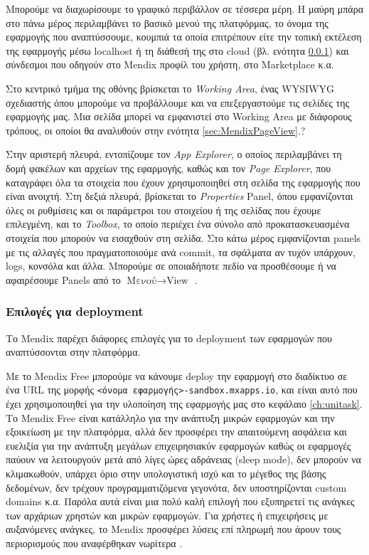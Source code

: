         Μπορούμε να διαχωρίσουμε το γραφικό περιβάλλον σε τέσσερα μέρη. Η μαύρη μπάρα στο πάνω μέρος περιλαμβάνει το βασικό μενού της πλατφόρμας, το όνομα της εφαρμογής που αναπτύσσουμε, κουμπιά τα οποία επιτρέπουν είτε την τοπική εκτέλεση της εφαρμογής μέσω localhost ή τη διάθεσή της στο cloud (βλ. ενότητα \ref{sec:MendixDeployment}) και σύνδεσμοι που οδηγούν στο Mendix προφίλ του χρήστη, στο Marketplace κ.α.

        Στο κεντρικό τμήμα της οθόνης βρίσκεται το \textit{Working Area}, ένας WYSIWYG σχεδιαστής όπου μπορούμε να προβάλλουμε και να επεξεργαστούμε τις σελίδες της εφαρμογής μας. Μια σελίδα μπορεί να εμφανιστεί στο Working Area με διάφορους τρόπους, οι οποίοι θα αναλυθούν στην ενότητα \ref{sec:MendixPageView}.?

        Στην αριστερή πλευρά, εντοπίζουμε τον \textit{App Explorer}, ο οποίος περιλαμβάνει τη δομή φακέλων και αρχείων της εφαρμογής, καθώς και τον \textit{Page Explorer}, που καταγράφει όλα τα στοιχεία που έχουν χρησιμοποιηθεί στη σελίδα της εφαρμογής που είναι ανοιχτή. Στη δεξιά πλευρά, βρίσκεται το \textit{Properties} Panel, όπου εμφανίζονται όλες οι ρυθμίσεις και οι παράμετροι του στοιχείου ή της σελίδας που έχουμε επιλεγμένη, και το \textit{Toolbox}, το οποίο περιέχει ένα σύνολο από προκατασκευασμένα στοιχεία που μπορούν να εισαχθούν στη σελίδα. Στο κάτω μέρος εμφανίζονται panels με τις αλλαγές που πραγματοποιούμε ανά commit, τα σφάλματα αν τυχόν υπάρχουν, logs, κονσόλα και άλλα. Μπορούμε σε οποιαδήποτε πεδίο να προσθέσουμε ή να αφαιρέσουμε Panels από το $ \text{Μενού} \rightarrow \text{View} $ \cite{mendixDoc}.

        \subsubsection{Επιλογές για deployment} \label{sec:MendixDeployment}
            Το Mendix παρέχει διάφορες επιλογές για το deployment των εφαρμογών που αναπτύσσονται στην πλατφόρμα.

            Με το Mendix Free μπορούμε να κάνουμε deploy την εφαρμογή στο διαδίκτυο σε ένα URL της μορφής \texttt{<όνομα εφαρμογής>-sandbox.mxapps.io}, και είναι αυτό που έχει χρησιμοποιηθεί για την υλοποίηση της εφαρμογής μας στο κεφάλαιο \ref{ch:unitask}. Το Mendix Free είναι κατάλληλο για την ανάπτυξη μικρών εφαρμογών και την εξοικείωση με την πλατφόρμα, αλλά δεν προσφέρει την απαιτούμενη ασφάλεια και ευελιξία για την ανάπτυξη μεγάλων επιχειρησιακύν εφαρμογών καθώς οι εφαρμογές παύουν να λειτουργούν μετά από λίγες ώρες αδράνειας (sleep mode), δεν μπορούν να κλιμακωθούν, υπάρχει όριο στην υπολογιστική ισχύ και το μέγεθος της βάσης δεδομένων, δεν τρέχουν προγραμματιζόμενα γεγονότα, δεν υποστηρίζονται custom domains κ.α. Παρόλα αυτά είναι μια πολύ καλή επιλογή που εξυπηρετεί τις ανάγκες των αρχάριων χρηστών και μικρών εφαρμογών. Για χρήστες ή επιχειρήσεις με αυξανόμενες ανάγκες, το Mendix προσφέρει λύσεις επί πληρωμή που άρουν τους περιορισμούς που αναφέρθηκαν νωρίτερα \cite{mendixCloud}.

